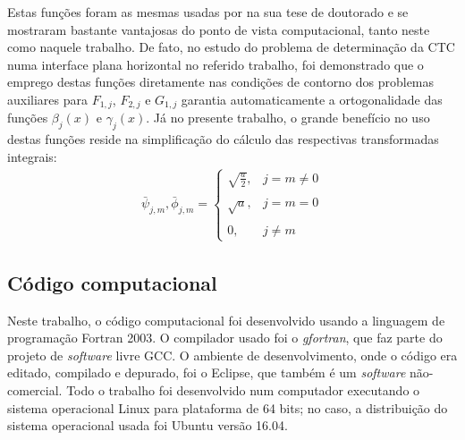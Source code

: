Estas funções foram as mesmas usadas por \cite{tese_padilha} na sua tese de doutorado e se mostraram bastante vantajosas do ponto de vista computacional, tanto neste como naquele trabalho. De fato, no estudo do problema de determinação da CTC numa interface plana horizontal no referido trabalho, foi demonstrado que o emprego destas funções diretamente nas condições de contorno dos problemas auxiliares para $F_{1,j}$, $F_{2,j}$ e $G_{1,j}$ garantia automaticamente a ortogonalidade das funções $\beta_j(x)$ e $\gamma_j(x)$. Já no presente trabalho, o grande benefício no uso destas funções reside na simplificação do cálculo das respectivas transformadas integrais:
\begin{align}
\bar{\psi}_{j, m}, \bar{\phi}_{j, m} = \left\lbrace
\begin{array}{ll}
\displaystyle\sqrt{\frac{a}{2}}, & j = m \ne 0 \\ \nonumber \\
\displaystyle\sqrt{a}, & j = m = 0 \\ \nonumber \\
0, & j \ne m 
\end{array}
\right.
\end{align}

\subsection{Código computacional}\label{sobre_o_programa}

Neste trabalho, o código computacional foi desenvolvido usando a linguagem de programação Fortran 2003. O compilador usado foi o \textit{gfortran}, que faz parte do projeto de \textit{software} livre GCC. O ambiente de desenvolvimento, onde o código era editado, compilado e depurado, foi o Eclipse, que também é um \textit{software} não-comercial. Todo o trabalho foi desenvolvido num computador executando o sistema operacional Linux para plataforma de 64 bits; no caso, a distribuição do sistema operacional usada foi Ubuntu versão 16.04.

